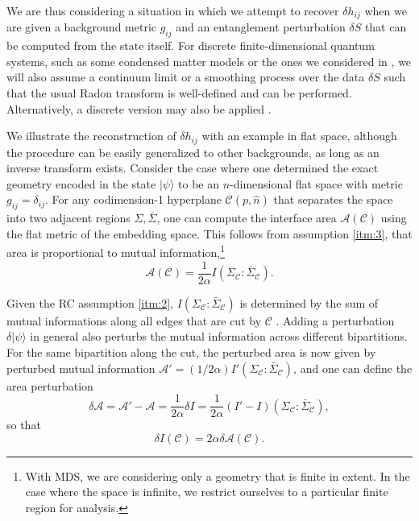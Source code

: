 \documentclass[%
preprint,
nofootinbib,
amsmath,amssymb,
aps,
prd,
showpacs,
superscriptaddress
]{revtex4-1}
\newcommand{\region}{\Sigma}
\newcommand{\area}{\mathcal{A}}
\DeclareMathOperator{\co}{:}
\begin{document}
We are thus considering a situation in which we attempt to recover $\delta h_{ij}$ when we are given a background metric $g_{ij}$ and an entanglement perturbation $\delta S$ that can be computed from the state itself. 
For discrete finite-dimensional quantum systems, such as some condensed matter models \cite{ising1,ising2, Kitaev97} or the ones we considered in  \cite{Cao:2016mst}, we will also assume a continuum limit or a smoothing process over the data $\delta S$ such that the usual Radon transform is well-defined and can be performed. Alternatively, a discrete version may also be applied  \cite{1165108}. 

We illustrate the reconstruction of $\delta h_{ij}$ with an example in flat space, although the procedure can be easily generalized to other backgrounds, as long as an inverse transform exists. Consider the case where one determined the  exact geometry encoded in the state $|\psi\rangle$ to be an $n$-dimensional flat space with metric $g_{ij}=\delta_{ij}$. For any codimension-1 hyperplane $\mathcal{C}(p,\hat{n})$ that separates the space into two adjacent regions ${\region}, \bar{\region}$, one can compute the interface area $\area(\mathcal{C})$ using the flat metric of the  embedding space. This follows from assumption \ref{itm:3}, that area is proportional to mutual information,\footnote{With MDS, we are considering only a geometry that is finite in extent. In the case where the space is infinite, we restrict ourselves to a particular finite region for analysis. }
\begin{equation}
\area(\mathcal{C})=\frac{1}{2\alpha} I({\region}_{\mathcal{C}}\co \bar{{\region}}_{\mathcal{C}}).
\label{eqn:aptmi}
\end{equation} 

Given the RC assumption \ref{itm:2}, $I({\region}_{\mathcal{C}}\co\bar{{\region}}_{\mathcal{C}})$ is determined by the sum of mutual informations along all edges that are cut by $\mathcal{C}$ \cite{Bao:2015boa}. 
Adding a perturbation $\delta|\psi\rangle$ in general also perturbs the mutual information across different bipartitions. For the same bipartition along the cut, the perturbed area is now given by perturbed mutual information $\area' = (1/2\alpha)I'({\region}_{\mathcal{C}}\co \bar{{\region}}_{\mathcal{C}})$, and one can define the area perturbation 
\begin{equation}
\delta \area =\area'-\area= \frac{1}{2\alpha} \delta I =  \frac{1}{2\alpha} (I'-I)({\region}_{\mathcal{C}}\co\bar{{\region}}_{\mathcal{C}}),
\end{equation}
so that
\begin{equation}
\delta I(\mathcal{C})=2\alpha\delta \area (\mathcal{C}).
\end{equation}
\end{document}

